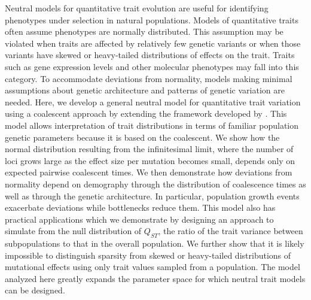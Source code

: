 Neutral models for quantitative trait evolution are useful for identifying
phenotypes under selection in natural populations. Models of quantitative traits
often assume phenotypes are normally distributed. This assumption may be
violated when traits are affected by relatively few genetic variants or when
those variants have skewed or heavy-tailed distributions of effects on the
trait. Traits such as gene expression levels and other molecular phenotypes may
fall into this category. To accommodate deviations from normality, models making
minimal assumptions about genetic architecture and patterns of genetic variation
are needed. Here, we develop a general neutral model for quantitative trait
variation using a coalescent approach by extending the framework developed
by \citet{Schraiber2015}. This model allows interpretation of trait
distributions in terms of familiar population genetic parameters because it is
based on the coalescent. We show how the normal distribution resulting from the
infinitesimal limit, where the number of loci grows large as the effect size per
mutation becomes small, depends only on expected pairwise coalescent times. We
then demonstrate how deviations from normality depend on demography through the
distribution of coalescence times as well as through the genetic architecture.
In particular, population growth events exacerbate deviations while bottlenecks
reduce them. This model also has practical applications which we demonstrate by
designing an approach to simulate from the null distribution of $Q_{ST}$, the
ratio of the trait variance between subpopulations to that in the overall
population. We further show that it is likely impossible to distinguish sparsity
from skewed or heavy-tailed distributions of mutational effects using only trait
values sampled from a population. The model analyzed here greatly expands the
parameter space for which neutral trait models can be designed.

